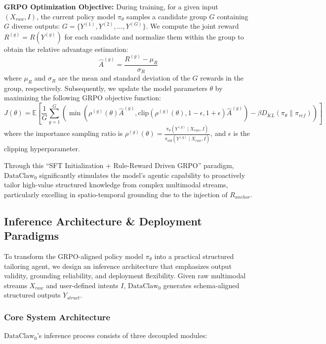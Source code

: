 \textbf{GRPO Optimization Objective:}
During training, for a given input \((X_{raw}, I)\), the current policy model \(\pi_\theta\) samples a candidate group \(G\) containing \(G\) diverse outputs: \(G = \{Y^{(1)}, Y^{(2)}, \dots, Y^{(G)}\}\).
We compute the joint reward \(R^{(g)} = R(Y^{(g)})\) for each candidate and normalize them within the group to obtain the relative advantage estimation:
\begin{equation}
\hat{A}^{(g)} = \frac{R^{(g)} - \mu_R}{\sigma_R}
\end{equation}
where \(\mu_R\) and \(\sigma_R\) are the mean and standard deviation of the \(G\) rewards in the group, respectively. Subsequently, we update the model parameters \(\theta\) by maximizing the following GRPO objective function:
\begin{equation}
J(\theta) = \mathbb{E}\left[\frac{1}{G}\sum\limits_{g=1}^G \left(\min\left(\rho^{(g)}(\theta)\hat{A}^{(g)}, \text{clip}(\rho^{(g)}(\theta), 1-\epsilon, 1+\epsilon)\hat{A}^{(g)}\right) - \beta D_{KL}(\pi_\theta \parallel \pi_{ref})\right)\right]
\end{equation}
where the importance sampling ratio is \(\rho^{(g)}(\theta) = \frac{\pi_\theta(Y^{(g)}\mid X_{raw},I)}{\pi_{old}(Y^{(g)}\mid X_{raw},I)}\), and \(\epsilon\) is the clipping hyperparameter. 

Through this ``SFT Initialization + Rule-Reward Driven GRPO'' paradigm, $\text{DataClaw}_0$ significantly stimulates the model's agentic capability to proactively tailor high-value structured knowledge from complex multimodal streams, particularly excelling in spatio-temporal grounding due to the injection of \(R_{anchor}\).

\subsection{Inference Architecture \& Deployment Paradigms}
\label{app:deployment}

To transform the GRPO-aligned policy model \(\pi_\theta\) into a practical structured tailoring agent, we design an inference architecture that emphasizes output validity, grounding reliability, and deployment flexibility. Given raw multimodal streams \(X_{raw}\) and user-defined intents \(I\), $\text{DataClaw}_0$ generates schema-aligned structured outputs \(Y_{struct}\).

\subsubsection{Core System Architecture}
\label{app:inf}
$\text{DataClaw}_0$'s inference process consists of three decoupled modules:
    
